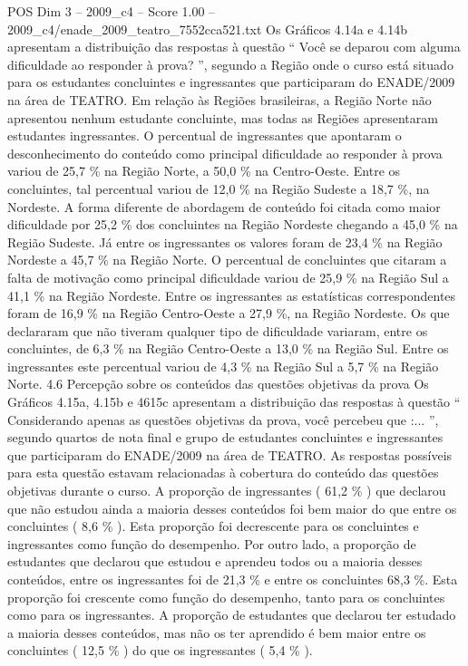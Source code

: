 \begin{textsample}{POS Dim 3 – 2009\_c4 – Score 1.00 – 2009\_c4/enade\_2009\_teatro\_7552cca521.txt}
Os Gráficos 4.14a e 4.14b apresentam a distribuição das respostas à questão “ Você se deparou com alguma dificuldade ao responder à prova? ”, segundo a Região onde o curso está situado para os estudantes concluintes e ingressantes que participaram do ENADE/2009 na área de TEATRO.
Em relação às Regiões brasileiras, a Região Norte não apresentou nenhum estudante concluinte, mas todas as Regiões apresentaram estudantes ingressantes.
O percentual de ingressantes que apontaram o desconhecimento do conteúdo como principal dificuldade ao responder à prova variou de 25,7 \% na Região Norte, a 50,0 \% na Centro-Oeste.
Entre os concluintes, tal percentual variou de 12,0 \% na Região Sudeste a 18,7 \%, na Nordeste.
A forma diferente de abordagem de conteúdo foi citada como maior dificuldade por 25,2 \% dos concluintes na Região Nordeste chegando a 45,0 \% na Região Sudeste.
Já entre os ingressantes os valores foram de 23,4 \% na Região Nordeste a 45,7 \% na Região Norte.
O percentual de concluintes que citaram a falta de motivação como principal dificuldade variou de 25,9 \% na Região Sul a 41,1 \% na Região Nordeste.
Entre os ingressantes as estatísticas correspondentes foram de 16,9 \% na Região Centro-Oeste a 27,9 \%, na Região Nordeste.
Os que declararam que não tiveram qualquer tipo de dificuldade variaram, entre os concluintes, de 6,3 \% na Região Centro-Oeste a 13,0 \% na Região Sul.
Entre os ingressantes este percentual variou de 4,3 \% na Região Sul a 5,7 \% na Região Norte. 4.6 Percepção sobre os conteúdos das questões objetivas da prova Os Gráficos 4.15a, 4.15b e 4615c apresentam a distribuição das respostas à questão “ Considerando apenas as questões objetivas da prova, você percebeu que :... ”, segundo quartos de nota final e grupo de estudantes concluintes e ingressantes que participaram do ENADE/2009 na área de TEATRO.
As respostas possíveis para esta questão estavam relacionadas à cobertura do conteúdo das questões objetivas durante o curso.
A proporção de ingressantes ( 61,2 \% ) que declarou que não estudou ainda a maioria desses conteúdos foi bem maior do que entre os concluintes ( 8,6 \% ).
Esta proporção foi decrescente para os concluintes e ingressantes como função do desempenho.
Por outro lado, a proporção de estudantes que declarou que estudou e aprendeu todos ou a maioria desses conteúdos, entre os ingressantes foi de 21,3 \% e entre os concluintes 68,3 \%.
Esta proporção foi crescente como função do desempenho, tanto para os concluintes como para os ingressantes.
A proporção de estudantes que declarou ter estudado a maioria desses conteúdos, mas não os ter aprendido é bem maior entre os concluintes ( 12,5 \% ) do que os ingressantes ( 5,4 \% ).

\end{textsample}
